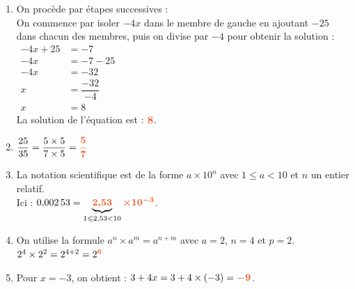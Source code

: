 \documentclass[a4paper,11pt]{article}
\newcounter{seancenum}
\newcounter{seancenumD}
\begin{document}
\setcounter{seancenumD}{24}
\newpage
\begin{seanceD}{} %

\begin{enumerate}
\item On procède par étapes successives :\\
      On commence par isoler $-4x$ dans le membre de gauche en ajoutant
      $-25$ dans chacun des membres, puis on divise
      par $-4$ pour obtenir la solution : \\
       $\begin{aligned}
       -4x+25&=-7\\
      -4x&=-7-25\\
      -4x&=-32\\
      x&=\dfrac{-32}{-4}\\
      x&=8
      \end{aligned}$\\
      La solution de l'équation est : ${\color[HTML]{f15929}\boldsymbol{8}}$.
      
	\item $ \dfrac{25}{35}=\dfrac{5\times 5}{7\times 5}
      ={\color[HTML]{f15929}\boldsymbol{\dfrac{5}{7}}}$
	\item La notation scientifique est de la forme $a\times 10^{n}$ avec $1\leqslant a <10$ et $n$ un entier relatif.\\
              Ici : $0{,}002\,53=\underbrace{{\color[HTML]{f15929}\boldsymbol{2{,}53}}}_{1\leqslant 2{,}53 <10}{\color[HTML]{f15929}\boldsymbol{\times}} {\color[HTML]{f15929}\boldsymbol{10^{-3}}}$. 
	\item On utilise la formule $a^n\times a^m=a^{n+m}$ avec $a=2$, $n=4$ et $p=2$.\\
            $2^{4}\times 2^{2}=2^{4+2}=2^{{\color[HTML]{f15929}\boldsymbol{6}}}$
	\item Pour $x=-3$, on obtient : 
            $3+4x=3+4\times(-3)={\color[HTML]{f15929}\boldsymbol{-9}}$.
            

\end{enumerate}
\end{seanceD}
\end{document}
